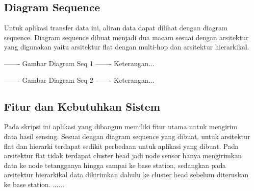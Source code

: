 \subsection{Diagram Sequence}
Untuk aplikasi transfer data ini, aliran data dapat dilihat dengan diagram sequence. Diagram sequence dibuat menjadi dua macam sesuai dengan arsitektur yang digunakan yaitu arsitektur flat dengan multi-hop dan arsitektur hierarkikal.

------- Gambar Diagram Seq 1 -------
Keterangan...

------- Gambar Diagram Seq 2 -------
Keterangan...

\subsection{Fitur dan Kebutuhkan Sistem}
Pada skripsi ini aplikasi yang dibangun memiliki fitur utama untuk mengirim data hasil sensing. Sesuai dengan diagram sequence yang dibuat, untuk arsitektur flat dan hierarki terdapat sedikit perbedaan untuk aplikasi yang dibuat. Pada arsitektur flat tidak terdapat cluster head jadi node sensor hanya mengirimkan data ke node tetangganya hingga sampai ke base station, sedangkan pada arsitektur hierarkikal data dikirimkan dahulu ke cluster head sebelum diteruskan ke base station.
...... 
